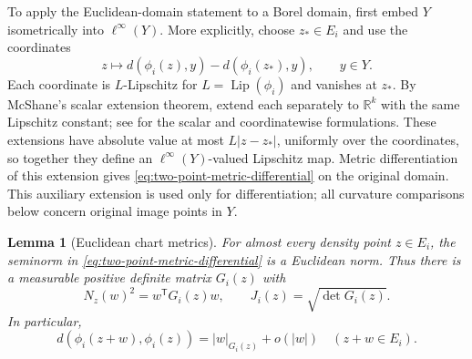 \documentclass[11pt]{article}
\numberwithin{equation}{section}
\newtheorem{lemma}[theorem]{Lemma}
\theoremstyle{definition}
\theoremstyle{remark}
\begin{document}
To apply the Euclidean-domain statement to a Borel domain, first embed
\(Y\) isometrically into \(\ell^\infty(Y)\). More explicitly, choose
\(z_*\in E_i\) and use the coordinates
\[
 z\longmapsto d(\phi_i(z),y)-d(\phi_i(z_*),y),\qquad y\in Y.
\]
Each coordinate is \(L\)-Lipschitz for \(L=\operatorname{Lip}(\phi_i)\) and vanishes
at \(z_*\). By McShane's scalar extension theorem, extend each separately
to \(\mathbb R^k\) with the same Lipschitz constant; see
\cite[Theorem~2.1 and Proposition~2.2]{Rieffel2006} for the scalar and
coordinatewise formulations. These extensions have absolute value at most
\(L|z-z_*|\), uniformly over the coordinates, so together they define
an \(\ell^\infty(Y)\)-valued Lipschitz map. Metric differentiation of
this extension gives \eqref{eq:two-point-metric-differential} on the
original domain. This auxiliary extension is used only for differentiation;
all curvature comparisons below concern original image points in \(Y\).

\begin{lemma}[Euclidean chart metrics]
\label{lem:euclidean-chart-metrics}
For almost every density point \(z\in E_i\), the seminorm in
\eqref{eq:two-point-metric-differential} is a Euclidean norm. Thus there
is a measurable positive definite matrix \(G_i(z)\) with
\begin{equation}
\label{eq:chart-metric}
 N_z(w)^2=w^{\mathsf T}G_i(z)w,
 \qquad J_i(z)=\sqrt{\det G_i(z)}.
\end{equation}
In particular,
\begin{equation}
\label{eq:centered-metric-differential}
 d(\phi_i(z+w),\phi_i(z))=|w|_{G_i(z)}+o(|w|)
 \quad (z+w\in E_i).
\end{equation}
\end{lemma}
\end{document}
